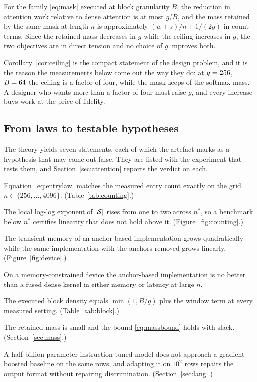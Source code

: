 \begin{corollary}\label{cor:ceiling}
For the family \eqref{eq:mask} executed at block granularity $B$, the reduction in
attention work relative to dense attention is at most $g/B$, and the mass retained
by the same mask at length $n$ is approximately $(w+s)/n + 1/(2g)$ in count terms.
Since the retained mass decreases in $g$ while the ceiling increases in $g$, the
two objectives are in direct tension and no choice of $g$ improves both.
\end{corollary}

Corollary~\ref{cor:ceiling} is the compact statement of the design problem, and it
is the reason the measurements below come out the way they do: at $g=256$,
$B=64$ the ceiling is a factor of four, while the mask keeps
\RhoMean{} of the softmax mass. A designer who wants more than a factor of four
must raise $g$, and every increase buys work at the price of fidelity.

\subsection{From laws to testable hypotheses}

The theory yields seven statements, each of which the artefact marks as a
hypothesis that may come out false. They are listed with the experiment that
tests them, and Section~\ref{sec:attention} reports the verdict on each.

\begin{description}\itemsep2pt
\item[H1] Equation~\eqref{eq:entrylaw} matches the measured entry count exactly on
the grid $n\in\{256,\dots,4096\}$. (Table~\ref{tab:counting}.)
\item[H2] The local log-log exponent of $\lvert\mathcal{S}\rvert$ rises from one to two
across $n^\ast$, so a benchmark below $n^\ast$ certifies linearity that does not
hold above it. (Figure~\ref{fig:counting}.)
\item[H3] The transient memory of an anchor-based implementation grows
quadratically while the same implementation with the anchors removed grows
linearly. (Figure~\ref{fig:device}.)
\item[H4] On a memory-constrained device the anchor-based implementation is no
better than a fused dense kernel in either memory or latency at large $n$.
\item[H5] The executed block density equals $\min(1,B/g)$ plus the window term at
every measured setting. (Table~\ref{tab:block}.)
\item[H6] The retained mass is small and the bound \eqref{eq:massbound} holds with
slack. (Section~\ref{sec:mass}.)
\item[H7] A half-billion-parameter instruction-tuned model does not approach a
gradient-boosted baseline on the same rows, and adapting it on $10^2$ rows
repairs the output format without repairing discrimination.
(Section~\ref{sec:lang}.)
\end{description}
